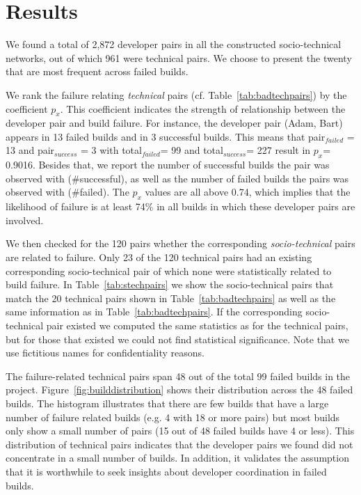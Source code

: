\section{Results}
\label{ch:fse:result2}
We found a total of 2,872 developer pairs in all the constructed
socio-technical networks, out of which 961 were technical pairs. %
We choose to present the twenty that are most frequent across failed builds.

We rank the failure relating \emph{technical} pairs (cf. Table~\ref{tab:badtechpairs})
by the coefficient $p_{x}$. This coefficient indicates the strength of
relationship between the developer pair and build failure. For instance, the
developer pair (Adam, Bart) appears in 13 failed builds and in 3
successful builds. This means that pair$_{failed}$ = 13 and pair$_{success}$ = 3
with total$_{failed}$= 99 and total$_{success}$= 227 result in $p_x$= 0.9016.
Besides that, we report the number of successful builds the pair was observed with
(\#successful), as well as the number of failed builds the pairs was observed with
(\#failed). The $p_x$ values are all above 0.74, which implies that the likelihood
of failure is at least 74\% in all builds in which these developer pairs are
involved. 

We then checked for the 120 pairs whether the corresponding \emph{socio-technical} pairs are related to failure.
Only 23 of the 120 technical pairs had an existing corresponding socio-technical pair of which none were statistically related to build failure. 
In Table~\ref{tab:stechpairs} we show the socio-technical pairs that match the 20 technical pairs shown in Table~\ref{tab:badtechpairs} as well as the same information as in Table~\ref{tab:badtechpairs}.
If the corresponding socio-technical pair existed we computed the same statistics as for the technical pairs, but for those that existed we could not find statistical significance.
Note that we use fictitious names for confidentiality reasons.

The failure-related technical pairs span 48 out of the total 99 failed builds in
the project. Figure~\ref{fig:builddistribution} shows their distribution
 across the 48 failed builds. The histogram
illustrates that there are few builds that have a large number of failure related
builds (e.g. 4 with 18 or more pairs) but most builds only show a small number of
pairs (15 out of 48 failed builds have 4 or less). 
This distribution of technical pairs indicates that the developer
pairs we found  did not concentrate in a small number of builds. 
In addition, it validates the assumption that it is
worthwhile to seek insights about developer coordination in failed builds.


